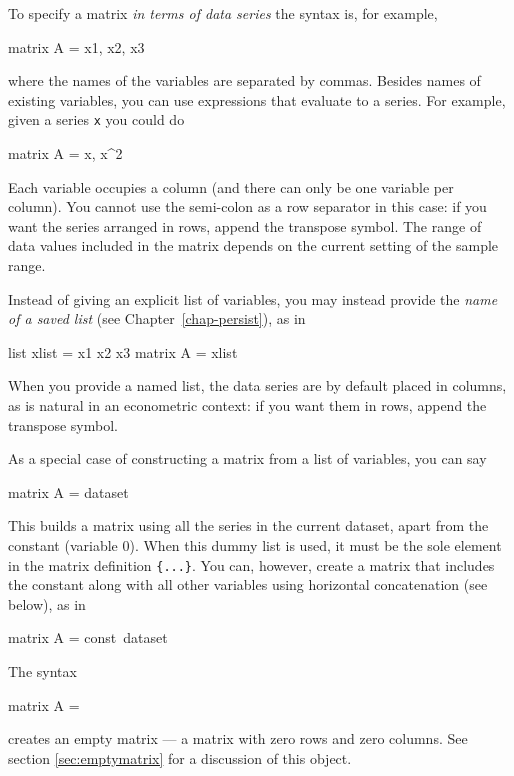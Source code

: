 To specify a matrix \textit{in terms of data series} the syntax is,
for example,
%
\begin{code}
matrix A = { x1, x2, x3 }
\end{code}
%
where the names of the variables are separated by commas.  Besides
names of existing variables, you can use expressions that evaluate to
a series.  For example, given a series \texttt{x} you could do
%
\begin{code}
matrix A = { x, x^2 }
\end{code}
%
Each variable occupies a column (and there can only be one variable
per column).  You cannot use the semi-colon as a row separator in this
case: if you want the series arranged in rows, append the transpose
symbol.  The range of data values included in the matrix depends on
the current setting of the sample range.


Instead of giving an explicit list of variables, you may instead
provide the \textit{name of a saved list} (see
Chapter~\ref{chap-persist}), as in
%
\begin{code}
list xlist = x1 x2 x3
matrix A = { xlist }
\end{code}
%
When you provide a named list, the data series are by default placed
in columns, as is natural in an econometric context: if you want them
in rows, append the transpose symbol.

As a special case of constructing a matrix from a list of variables,
you can say
%
\begin{code}
matrix A = { dataset }
\end{code}
%
This builds a matrix using all the series in the current dataset,
apart from the constant (variable 0).  When this dummy list is used, it
must be the sole element in the matrix definition \texttt{\{...\}}.  You
can, however, create a matrix that includes the constant along with
all other variables using horizontal concatenation (see below), as in
%
\begin{code}
matrix A = {const}~{dataset}
\end{code}
%

The syntax 
%
\begin{code}
matrix A = {}
\end{code}
%
creates an empty matrix --- a matrix with zero rows and zero columns.
See section \ref{sec:emptymatrix} for a discussion of this
object.

